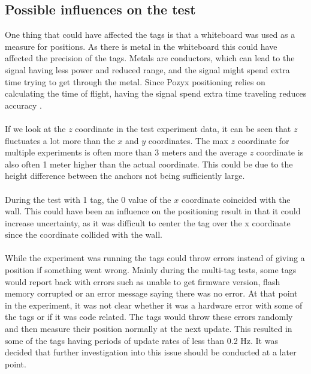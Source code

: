 \subsection{Possible influences on the test}
One thing that could have affected the tags is that a whiteboard was used as a measure for positions. 
As there is metal in the whiteboard this could have affected the precision of the tags.
Metals are conductors, which can lead to the signal having less power and reduced range, and the signal might spend extra time trying to get through the metal.
Since Pozyx positioning relies on calculating the time of flight, having the signal spend extra time traveling reduces accuracy \cite{pozyx-UWBObstacles}. 
\\\\
If we look at the $z$ coordinate in the test experiment data, it can be seen that $z$ fluctuates a lot more than the $x$ and $y$ coordinates. 
The max $z$ coordinate for multiple experiments is often more than 3 meters and the average $z$ coordinate is also often 1 meter higher than the actual coordinate.
This could be due to the height difference between the anchors not being sufficiently large.
\\\\
During the test with 1 tag, the 0 value of the $x$ coordinate coincided with the wall. 
This could have been an influence on the positioning result in that it could increase uncertainty, as it was difficult to center the tag over the x coordinate since the coordinate collided with the wall.
\\\\
While the experiment was running the tags could throw errors instead of giving a position if something went wrong.
Mainly during the multi-tag tests, some tags would report back with errors such as unable to get firmware version, flash memory corrupted or an error message saying there was no error.
At that point in the experiment, it was not clear whether it was a hardware error with some of the tags or if it was code related.
The tags would throw these errors randomly and then measure their position normally at the next update.
This resulted in some of the tags having periods of update rates of less than 0.2 Hz.
It was decided that further investigation into this issue should be conducted at a later point.

